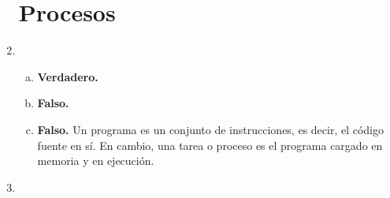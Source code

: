 \documentclass[11pt]{article}
\begin{document}
\begin{enumerate}[1)]
    \section*{Procesos}
    \item 
      \begin{enumerate}[(a)]
        \item \textbf{Verdadero.}
        \item \textbf{Falso.}
        \item \textbf{Falso.} Un programa es un conjunto de instrucciones, es decir,
              el código fuente en sí. En cambio, una tarea o proceso es el programa
              cargado en memoria y en ejecución.
      \end{enumerate}
    \item
\end{enumerate}
\end{document}

